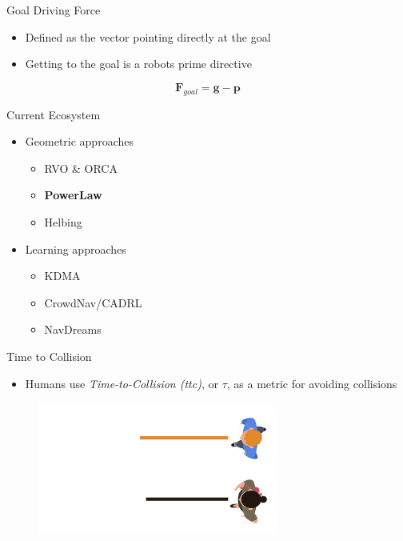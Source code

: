 \documentclass[aspectratio=169,xcolor=dvipsnames]{beamer}
\begin{document}
\begin{frame}{Goal Driving Force}
  \begin{itemize}
    \item Defined as the vector pointing directly at the goal
    \item Getting to the goal is a robots prime directive
  \end{itemize}
  \[
    \mathbf{F}_{goal} = \mathbf{g} - \mathbf{p}
  \]
\end{frame}


\begin{frame}{Current Ecosystem}
  \begin{itemize}
    \item Geometric approaches
    \begin{itemize}
      \item RVO \& ORCA
      \item \textbf{PowerLaw}
      \item Helbing
    \end{itemize}
    \item Learning approaches
    \begin{itemize}
      \item KDMA
      \item CrowdNav/CADRL
      \item NavDreams
    \end{itemize}
  \end{itemize}
\end{frame}

\begin{frame}{Time to Collision}
  \begin{itemize}
    \item Humans use \textit{Time-to-Collision (ttc)}, or $\tau$, as a metric for avoiding collisions
  \end{itemize}
  \begin{figure}
    \includegraphics[width=0.7\textwidth]{imgs/no_ttc.png}
  \end{figure}
\end{frame}
\end{document}

